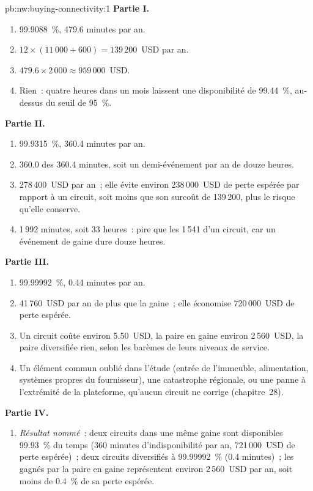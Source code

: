 \begin{solution}{pb:nw:buying-connectivity:1}
\textbf{Partie I.}
\begin{enumerate}
\item 99.9088~\%, 479.6 minutes par an.
\item $12 \times (11\,000 + 600) = 139\,200$~USD par an.
\item $479.6 \times 2\,000 \approx 959\,000$~USD.
\item Rien~: quatre heures dans un mois laissent une disponibilité de 99.44~\%, au-dessus du seuil de 95~\%.
\end{enumerate}
\textbf{Partie II.}
\begin{enumerate}[resume]
\item 99.9315~\%, 360.4 minutes par an.
\item 360.0 des 360.4 minutes, soit un demi-événement par an de douze heures.
\item 278\,400~USD par an~; elle évite environ 238\,000~USD de perte espérée par rapport à un circuit, soit moins que son surcoût de 139\,200, plus le risque qu'elle conserve.
\item 1\,992 minutes, soit 33 heures~: pire que les 1\,541 d'un circuit, car un événement de gaine dure douze heures.
\end{enumerate}
\textbf{Partie III.}
\begin{enumerate}[resume]
\item 99.99992~\%, 0.44 minutes par an.
\item 41\,760~USD par an de plus que la gaine~; elle économise 720\,000~USD de perte espérée.
\item Un circuit coûte environ 5.50~USD, la paire en gaine environ 2\,560~USD, la paire diversifiée rien, selon les barèmes de leurs niveaux de service.
\item Un élément commun oublié dans l'étude (entrée de l'immeuble, alimentation, systèmes propres du fournisseur), une catastrophe régionale, ou une panne à l'extrémité de la
  plateforme, qu'aucun circuit ne corrige (chapitre~28).
\end{enumerate}
\textbf{Partie IV.}
\begin{enumerate}[resume]
\item \emph{Résultat nommé}~: deux circuits dans une même gaine sont disponibles 99.93~\% du temps (360 minutes d'indisponibilité par an, 721\,000~USD de perte espérée)~; deux
  circuits diversifiés à 99.99992~\% (0.4 minutes)~; les  gagnés par la paire en gaine représentent environ 2\,560~USD par an, soit moins de 0.4~\% de sa perte espérée.

\end{enumerate}
\end{solution}
